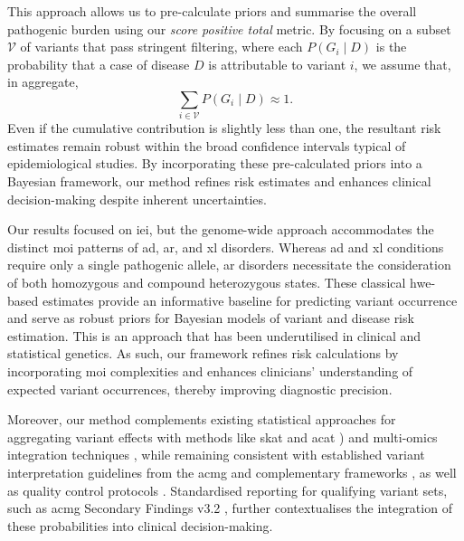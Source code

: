This approach allows us to pre-calculate priors and summarise the overall pathogenic burden using our \emph{score positive total} metric. By focusing on a subset \(\mathcal{V}\) of variants that pass stringent filtering, where each \(P(G_i \mid D)\) is the probability that a case of disease \(D\) is attributable to variant \(i\), we assume that, in aggregate,
\[
\sum_{i\in\mathcal{V}} P(G_i\mid D) \approx 1.
\]
Even if the cumulative contribution is slightly less than one, the resultant risk estimates remain robust within the broad confidence intervals typical of epidemiological studies. By incorporating these pre-calculated priors into a Bayesian framework, our method refines risk estimates and enhances clinical decision-making despite inherent uncertainties.

Our results focused on \ac{iei}, but the genome-wide approach accommodates the distinct \ac{moi} patterns of \ac{ad}, \ac{ar}, and \ac{xl} disorders. Whereas \ac{ad} and \ac{xl} conditions require only a single pathogenic allele, \ac{ar} disorders necessitate the consideration of both homozygous and compound heterozygous states. These classical \ac{hwe}-based estimates provide an informative baseline for predicting variant occurrence and serve as robust priors for Bayesian models of variant and disease risk estimation. This is an approach that has been underutilised in clinical and statistical genetics. As such, our framework refines risk calculations by incorporating \ac{moi} complexities and enhances clinicians’ understanding of expected variant occurrences, thereby improving diagnostic precision.

Moreover, our method complements existing statistical approaches for aggregating variant effects with methods like \ac{skat} and \ac{acat} \cite{liu2019acat,li2020dynamic,wu2011rare,lee2012optimal}) and multi-omics integration techniques \cite{kong2018nature,howe2021within}, while remaining consistent with established variant interpretation guidelines from the \ac{acmg} \cite{richards2015standards} and complementary frameworks \cite{tavtigian2020fitting,li2017intervar}, as well as quality control protocols \cite{pedersen2021effective,anderson2010data}. Standardised reporting for qualifying variant sets, such as \ac{acmg} Secondary Findings v3.2 \cite{miller2023acmg}, further contextualises the integration of these probabilities into clinical decision-making.

